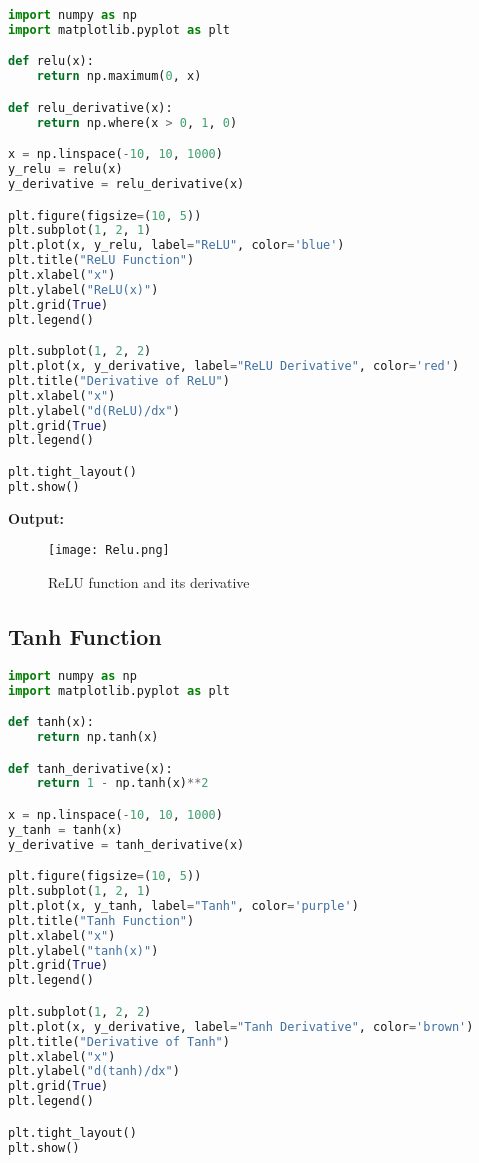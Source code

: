 \documentclass[11pt]{article}
\begin{document}
\begin{lstlisting}[language=Python, caption={ReLU function and its derivative}]
import numpy as np
import matplotlib.pyplot as plt

def relu(x):
    return np.maximum(0, x)

def relu_derivative(x):
    return np.where(x > 0, 1, 0)

x = np.linspace(-10, 10, 1000)
y_relu = relu(x)
y_derivative = relu_derivative(x)

plt.figure(figsize=(10, 5))
plt.subplot(1, 2, 1)
plt.plot(x, y_relu, label="ReLU", color='blue')
plt.title("ReLU Function")
plt.xlabel("x")
plt.ylabel("ReLU(x)")
plt.grid(True)
plt.legend()

plt.subplot(1, 2, 2)
plt.plot(x, y_derivative, label="ReLU Derivative", color='red')
plt.title("Derivative of ReLU")
plt.xlabel("x")
plt.ylabel("d(ReLU)/dx")
plt.grid(True)
plt.legend()

plt.tight_layout()
plt.show()
\end{lstlisting}

\noindent\textbf{Output:}
\begin{figure}[H]
    \centering
    \texttt{[image: Relu.png]}
    \caption{ReLU function and its derivative}
\end{figure}

\subsection{Tanh Function}

\begin{lstlisting}[language=Python, caption={Tanh function and its derivative}]
import numpy as np
import matplotlib.pyplot as plt

def tanh(x):
    return np.tanh(x)

def tanh_derivative(x):
    return 1 - np.tanh(x)**2

x = np.linspace(-10, 10, 1000)
y_tanh = tanh(x)
y_derivative = tanh_derivative(x)

plt.figure(figsize=(10, 5))
plt.subplot(1, 2, 1)
plt.plot(x, y_tanh, label="Tanh", color='purple')
plt.title("Tanh Function")
plt.xlabel("x")
plt.ylabel("tanh(x)")
plt.grid(True)
plt.legend()

plt.subplot(1, 2, 2)
plt.plot(x, y_derivative, label="Tanh Derivative", color='brown')
plt.title("Derivative of Tanh")
plt.xlabel("x")
plt.ylabel("d(tanh)/dx")
plt.grid(True)
plt.legend()

plt.tight_layout()
plt.show()
\end{lstlisting}
\end{document}
